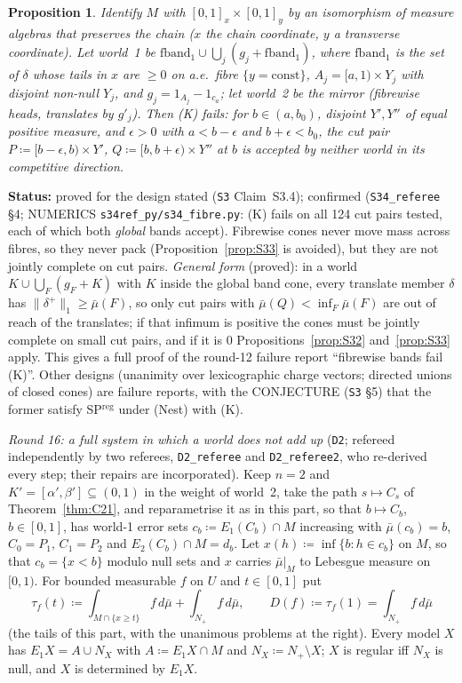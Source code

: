 \documentclass[11pt]{article}
\newtheorem{proposition}[theorem]{Proposition}
\theoremstyle{definition}
\theoremstyle{remark}
\newcommand{\src}[1]{\texttt{#1}}
\newcommand{\status}[1]{\par\smallskip\noindent\textbf{Status:} #1\par\smallskip}
\begin{document}
\begin{proposition}\label{prop:S34}
Identify $M$ with $[0,1]_x\times[0,1]_y$ by an isomorphism of measure algebras that preserves the chain ($x$ the chain coordinate, $y$ a transverse coordinate). Let world~1 be $\mathrm{fband}_1\cup\bigcup_j(g_j+\mathrm{fband}_1)$, where $\mathrm{fband}_1$ is the set of $\delta$ whose tails in $x$ are $\ge0$ on a.e.\ fibre $\{y=\text{const}\}$, $A_j=[a,1)\times Y_j$ with disjoint non-null $Y_j$, and $g_j=1_{A_j}-1_{c_a}$; let world~2 be the mirror (fibrewise heads, translates by $g'_j$). Then (K) fails: for $b\in(a,b_0)$, disjoint $Y',Y''$ of equal positive measure, and $\epsilon>0$ with $a<b-\epsilon$ and $b+\epsilon<b_0$, the cut pair $P\coloneqq[b-\epsilon,b)\times Y'$, $Q\coloneqq[b,b+\epsilon)\times Y''$ at $b$ is accepted by neither world in its competitive direction.
\end{proposition}
\status{proved for the design stated (\src{S3} Claim~S3.4); confirmed (\src{S34\_referee} \S4; NUMERICS \src{s34ref\_py/s34\_fibre.py}: (K) fails on all 124 cut pairs tested, each of which both \emph{global} bands accept). Fibrewise cones never move mass across fibres, so they never pack (Proposition~\ref{prop:S33} is avoided), but they are not jointly complete on cut pairs. \emph{General form} (proved): in a world $K\cup\bigcup_F(g_F+K)$ with $K$ inside the global band cone, every translate member $\delta$ has $\|\delta^+\|_1\ge\bar\mu(F)$, so only cut pairs with $\bar\mu(Q)<\inf_F\bar\mu(F)$ are out of reach of the translates; if that infimum is positive the cones must be jointly complete on small cut pairs, and if it is $0$ Propositions~\ref{prop:S32} and~\ref{prop:S33} apply. This gives a full proof of the round-12 failure report ``fibrewise bands fail (K)''. Other designs (unanimity over lexicographic charge vectors; directed unions of closed cones) are failure reports, with the CONJECTURE (\src{S3} \S5) that the former satisfy SP$^{\mathrm{reg}}$ under (Nest) with (K).}
\emph{Round 16: a full system in which a world does not add up} (\src{D2}; refereed independently by two referees, \src{D2\_referee} and \src{D2\_referee2}, who re-derived every step; their repairs are incorporated). Keep $n=2$ and $K'=[\alpha',\beta']\subseteq(0,1)$ in the weight of world~2, take the path $s\mapsto C_s$ of Theorem~\ref{thm:C21}, and reparametrise it as in this part, so that $b\mapsto C_b$, $b\in[0,1]$, has world-1 error sets $c_b\coloneqq E_1(C_b)\cap M$ increasing with $\bar\mu(c_b)=b$, $C_0=P_1$, $C_1=P_2$ and $E_2(C_b)\cap M=d_b$. Let $x(h)\coloneqq\inf\{b:h\in c_b\}$ on $M$, so that $c_b=\{x<b\}$ modulo null sets and $x$ carries $\bar\mu|_M$ to Lebesgue measure on $[0,1)$. For bounded measurable $f$ on $U$ and $t\in[0,1]$ put
\[
\tau_f(t)\coloneqq\int_{M\cap\{x\ge t\}}f\,d\bar\mu+\int_{N_+}f\,d\bar\mu,\qquad D(f)\coloneqq\tau_f(1)=\int_{N_+}f\,d\bar\mu
\]
(the tails of this part, with the unanimous problems at the right). Every model $X$ has $E_1X=A\cup N_X$ with $A\coloneqq E_1X\cap M$ and $N_X\coloneqq N_+\setminus X$; $X$ is regular iff $N_X$ is null, and $X$ is determined by $E_1X$.
\end{document}
